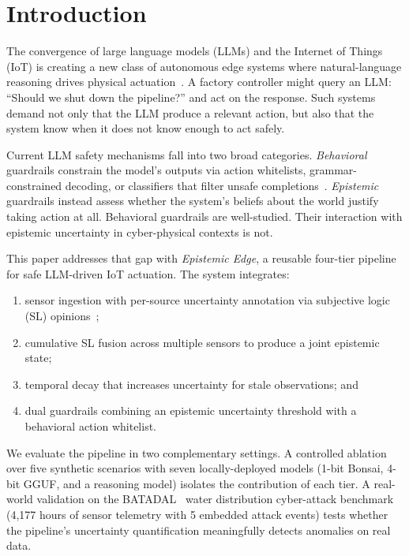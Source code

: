\documentclass[conference]{IEEEtran}
\begin{document}
\section{Introduction}

The convergence of large language models (LLMs) and the Internet of Things (IoT) is creating a new class of autonomous edge systems where natural-language reasoning drives physical actuation~\cite{friha2024llmedge, alwahedi2024iotml}. A factory controller might query an LLM: ``Should we shut down the pipeline?'' and act on the response. Such systems demand not only that the LLM produce a relevant action, but also that the system know when it does not know enough to act safely.

Current LLM safety mechanisms fall into two broad categories. \textit{Behavioral} guardrails constrain the model's outputs via action whitelists, grammar-constrained decoding, or classifiers that filter unsafe completions~\cite{rebedea2023nemo, inan2023llama}. \textit{Epistemic} guardrails instead assess whether the system's beliefs about the world justify taking action at all. Behavioral guardrails are well-studied. Their interaction with epistemic uncertainty in cyber-physical contexts is not.

This paper addresses that gap with \textit{Epistemic Edge}, a reusable four-tier pipeline for safe LLM-driven IoT actuation. The system integrates:
\begin{enumerate}
    \item sensor ingestion with per-source uncertainty annotation via subjective logic (SL) opinions~\cite{josang2016subjective};
    \item cumulative SL fusion across multiple sensors to produce a joint epistemic state;
    \item temporal decay that increases uncertainty for stale observations; and
    \item dual guardrails combining an epistemic uncertainty threshold with a behavioral action whitelist.
\end{enumerate}

We evaluate the pipeline in two complementary settings. A controlled ablation over five synthetic scenarios with seven locally-deployed models (1-bit Bonsai, 4-bit GGUF, and a reasoning model) isolates the contribution of each tier. A real-world validation on the BATADAL~\cite{taormina2018battle} water distribution cyber-attack benchmark (4{,}177 hours of sensor telemetry with 5 embedded attack events) tests whether the pipeline's uncertainty quantification meaningfully detects anomalies on real data.
\end{document}
